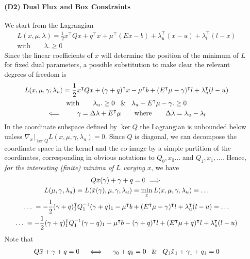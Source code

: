 \documentclass[10pt,twoside,book,a5paper]{ncc}
\begin{document}
\paragraph{(D2) Dual Flux and Box Constraints}
We start from the Lagrangian
    \begin{gather*}
    L(x, \mu, \lambda) = \frac{1}{2}x^\intercal Q x + q^\intercal x + \mu^\intercal(Ex - b) + \lambda_u^\intercal(x-u) + \lambda_l^\intercal(l-x) \\
    \textrm{with} \qquad \lambda .\ge 0
    \end{gather*}
Since the linear coefficients of $x$ will determine the position of the minimum of $L$ for fixed dual parameters, a possible substitution to make clear the relevant degrees of freedom is
    \begin{gather*}
    L(x, \mu, \gamma, \lambda_u) = \frac{1}{2}x^\intercal Q x + (\gamma + q)^\intercal x - \mu^\intercal b + (E^\intercal\mu - \gamma)^\intercal l + \lambda_u^\intercal(l-u) \\
    \textrm{with} \qquad \lambda_u .\ge 0 \; \And \; \lambda_u + E^\intercal\mu - \gamma .\ge 0 \\
    \impliedby \qquad
    \gamma = \Delta \lambda + E^\intercal \mu \qquad \textrm{where} \qquad \Delta \lambda = \lambda_u - \lambda_l
    \end{gather*}
In the coordinate subspace defined by $\ker Q$ the Lagrangian is unbounded below unless $\nabla_x|_{\ker Q} L(x, \mu, \gamma, \lambda_u) = 0$.
Since $Q$ is diagonal, we can decompose the coordinate space in the kernel and the co-image by a simple partition of the coordinates, corresponding in obvious notations to $Q_0, x_0 \dots$ and $Q_1, x_1, \dots$. Hence, \emph{for the interesting (finite) minima of $L$ varying $x$}, we have
    \begin{gather*}
    Q \Bar{x}(\gamma) + \gamma + q = 0 \implies \\
    L(\mu, \gamma, \lambda_u) = L(\Bar{x}(\gamma), \mu, \gamma, \lambda_u) = \min_x L(x, \mu, \gamma, \lambda_u) = \dots \\
    \dots \; = -\frac{1}{2}(\gamma + q)_1^\intercal Q_1^{-1} (\gamma + q)_1 - \mu^\intercal b + (E^\intercal\mu - \gamma)^\intercal l + \lambda_u^\intercal(l-u) = \dots \\
    \dots \; = -\frac{1}{2}(\gamma + q)_1^\intercal Q_1^{-1} (\gamma + q)_1 - \mu^\intercal b - (\gamma + q)^\intercal l + (E^\intercal\mu + q)^\intercal l + \lambda_u^\intercal(l-u)
    \end{gather*}
Note that
    \begin{gather*}
    Q \Bar{x} + \gamma + q = 0 \quad \iff \quad \gamma_0 + q_0 = 0 \; \And \; Q_1 \Bar{x}_1 + \gamma_1 + q_1 = 0
    \end{gather*}
\end{document}
